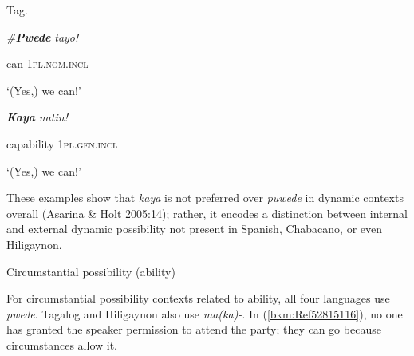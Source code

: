 \begin{listWWNumiileveli}
\item 
\begin{stylelsLanginfo}
Tag.
\end{stylelsLanginfo}

\begin{listWWNumiilevelii}
\item 
\begin{stylelsLanginfo}
\textit{\#}\textbf{\textit{Pwede}}\textit{ tayo!}
\end{stylelsLanginfo}
\end{listWWNumiilevelii}
\end{listWWNumiileveli}
\begin{stylelsIMT}
can 1\textsc{pl.nom.incl}
\end{stylelsIMT}

\begin{stylelsTranslation}
‘(Yes,) we can!’
\end{stylelsTranslation}

\begin{listWWNumiileveli}
\item 
\begin{listWWNumiilevelii}
\item 
\begin{stylelsLanginfo}
\textbf{\textit{Kaya}}\textit{ natin!}
\end{stylelsLanginfo}
\end{listWWNumiilevelii}
\end{listWWNumiileveli}
\begin{stylelsIMT}
capability 1\textsc{pl.gen.incl}
\end{stylelsIMT}

\begin{stylelsTranslation}
‘(Yes,) we can!’
\end{stylelsTranslation}

\begin{styleStandard}
These examples show that \textit{kaya} is not preferred over \textit{puwede} in dynamic contexts overall (Asarina \& Holt 2005:14); rather, it encodes a distinction between internal and external dynamic possibility not present in Spanish, Chabacano, or even Hiligaynon.
\end{styleStandard}


\setcounter{listWWNumiiileveli}{0}
\begin{listWWNumiiileveli}
\item 
\begin{stylelsSectioniii}
Circumstantial possibility (ability)
\end{stylelsSectioniii}
\end{listWWNumiiileveli}
\begin{styleStandard}
For circumstantial possibility contexts related to ability, all four languages use \textit{pwede}. Tagalog and Hiligaynon also use \textit{ma(ka)-}. In (\ref{bkm:Ref52815116}), no one has granted the speaker permission to attend the party; they can go because circumstances allow it.
\end{styleStandard}


